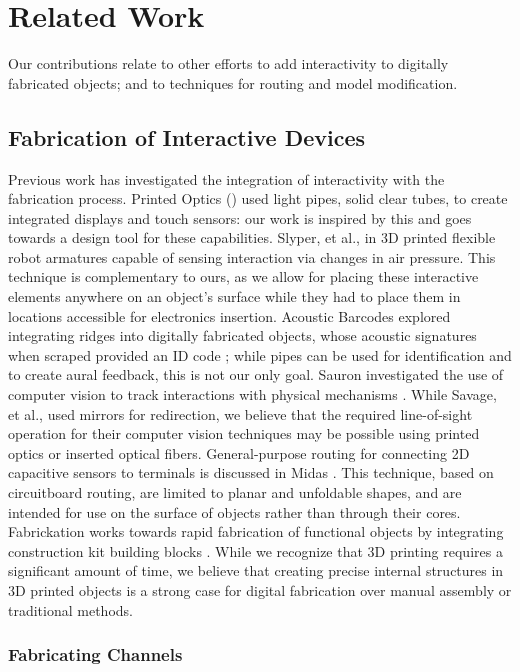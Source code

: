 \section{Related Work}
Our contributions relate to other efforts to add interactivity to digitally fabricated objects; and to techniques for routing and model modification.  

\subsection{Fabrication of Interactive Devices}

Previous work has investigated the integration of interactivity with the fabrication process.  Printed Optics (\cite{Willis-printedoptics}) used light pipes, solid clear tubes, to create integrated displays and touch sensors: our work is inspired by this and goes towards a design tool for these capabilities.  Slyper, et al., in \cite{Slyper-pressure} 3D printed flexible robot armatures capable of sensing interaction via changes in air pressure.  This technique is complementary to ours, as we allow for placing these interactive elements anywhere on an object's surface while they had to place them in locations accessible for electronics insertion. Acoustic Barcodes explored integrating ridges into digitally fabricated objects, whose acoustic signatures when scraped provided an ID code \cite{Harrison-acoustic}; while pipes can be used for identification and to create aural feedback, this is not our only goal.   Sauron investigated the use of computer vision to track interactions with physical mechanisms \cite{Savage-sauron}.  While Savage, et al., used mirrors for redirection, we believe that the required line-of-sight operation for their computer vision techniques may be possible using printed optics or inserted optical fibers.  General-purpose routing for connecting 2D capacitive sensors to terminals is discussed in Midas \cite{Savage-midas}.  This technique, based on circuitboard routing, are limited to planar and unfoldable shapes, and are intended for use on the surface of objects rather than through their cores.  Fabrickation works towards rapid fabrication of functional objects by integrating construction kit building blocks \cite{Mueller-fabrickation}.  While we recognize that 3D printing requires a significant amount of time, we believe that creating precise internal structures in 3D printed objects is a strong case for digital fabrication over manual assembly or traditional methods.

\subsubsection{Fabricating Channels}


